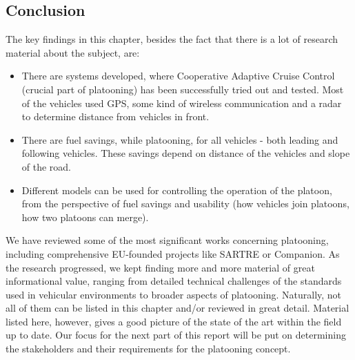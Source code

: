 \subsection{Conclusion}
The key findings in this chapter, besides the fact that there is a lot of research material about the subject, are:
\begin{itemize}[noitemsep]
    \item There are systems developed, where Cooperative Adaptive Cruise Control (crucial part of platooning) has been successfully tried out and tested. Most of the vehicles used GPS, some kind of wireless communication and a radar to determine distance from vehicles in front.
    \item There are fuel savings, while platooning, for all vehicles - both leading and following vehicles. These savings depend on distance of the vehicles and slope of the road.
    \item Different models can be used for controlling the operation of the platoon, from the perspective of fuel savings and usability (how vehicles join platoons, how two platoons can merge).
\end{itemize}
% 
We have reviewed some of the most significant works concerning platooning, including comprehensive EU-founded projects like SARTRE or Companion. As the research progressed, we kept finding more and more material of great informational value, ranging from detailed technical challenges of the standards used in vehicular environments to broader aspects of platooning. Naturally, not all of them can be listed in this chapter and/or reviewed in great detail. Material listed here, however, gives a good picture of the state of the art within the field up to date. Our focus for the next part of this report will be put on determining the stakeholders and their requirements for the platooning concept.\par
